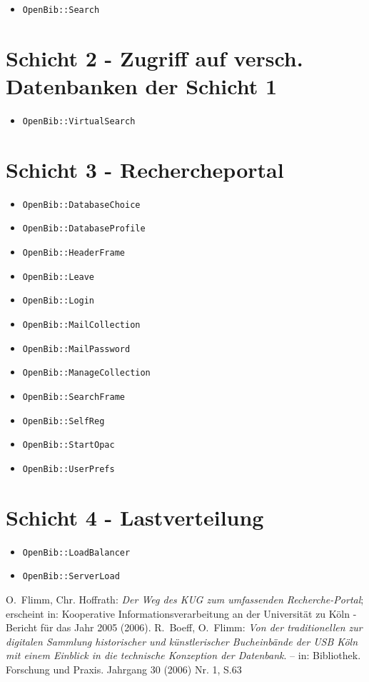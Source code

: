 \documentclass[11pt, twoside, a4paper, BCOR8mm, DIV12, bibtotoc,idxtotoc]{scrbook}
\begin{document}
\begin{itemize}
\item \texttt{OpenBib::Search}
\end{itemize}

\section{Schicht 2 - Zugriff auf versch. Datenbanken der Schicht 1}

\begin{itemize}
\item \texttt{OpenBib::VirtualSearch}
\end{itemize}

\section{Schicht 3 - Rechercheportal}

\begin{itemize}
\item \texttt{OpenBib::DatabaseChoice}
\item \texttt{OpenBib::DatabaseProfile}
\item \texttt{OpenBib::HeaderFrame}
\item \texttt{OpenBib::Leave}
\item \texttt{OpenBib::Login}
\item \texttt{OpenBib::MailCollection}
\item \texttt{OpenBib::MailPassword}
\item \texttt{OpenBib::ManageCollection}
\item \texttt{OpenBib::SearchFrame}
\item \texttt{OpenBib::SelfReg}
\item \texttt{OpenBib::StartOpac}
\item \texttt{OpenBib::UserPrefs}
\end{itemize}

\section{Schicht 4 - Lastverteilung}

\begin{itemize}
\item \texttt{OpenBib::LoadBalancer}
\item \texttt{OpenBib::ServerLoad}
\end{itemize}


\begin{thebibliography}{ChBr82}
\originalTeX

 O.~Flimm, Chr. Hoffrath: \emph{Der
    Weg des KUG zum umfassenden Recherche-Portal}; erscheint in:
  Kooperative Informationsverarbeitung an der Universität zu Köln -
  Bericht für das Jahr 2005 (2006).
 R.~Boeff, O.~Flimm: \emph{Von
    der traditionellen zur digitalen Sammlung historischer und
    künstlerischer Bucheinbände der USB Köln mit einem Einblick in die
    technische Konzeption der Datenbank}. -- in: Bibliothek. Forschung
  und Praxis. Jahrgang 30 (2006) Nr. 1, S.63
\end{thebibliography}
\germanTeX
\end{document}
